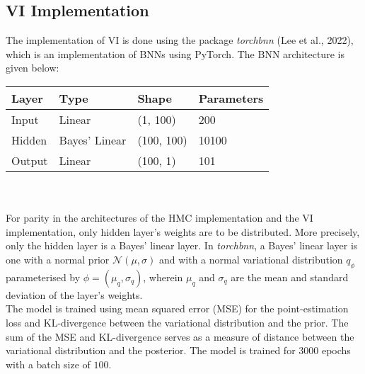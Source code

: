 \documentclass[conference]{IEEEtran}
\begin{document}
\subsection{VI Implementation}
The implementation of VI is done using the package \textit{torchbnn} (Lee et al., 2022), which is an implementation of BNNs using PyTorch. The BNN architecture is given below:\\

\begin{tabular}{| m{1cm} | m{2cm} | m{1.5cm} | m{2cm} |}
    \hline
    \textbf{Layer} & \textbf{Type} & \textbf{Shape} & \textbf{Parameters} \\
    \hline
    Input & Linear & (1, 100) & 200 \\
    \hline
    Hidden & Bayes' Linear & (100, 100) & 10100 \\
    \hline
    Output & Linear & (100, 1) & 101 \\
    \hline
\end{tabular} \\~\\

For parity in the architectures of the HMC implementation and the VI implementation, only hidden layer's weights are to be distributed. More precisely, only the hidden layer is a Bayes' linear layer. In \textit{torchbnn}, a Bayes' linear layer is one with a normal prior $\mathcal{N}(\mu, \sigma)$ and with a normal variational distribution $q_\phi$ parameterised by $\phi = (\mu_q, \sigma_q)$, wherein $\mu_q$ and $\sigma_q$ are the mean and standard deviation of the layer's weights.\\

The model is trained using mean squared error (MSE) for the point-estimation loss and KL-divergence between the variational distribution and the prior. The sum of the MSE and KL-divergence serves as a measure of distance between the variational distribution and the posterior. The model is trained for $3000$ epochs with a batch size of $100$.
\end{document}

